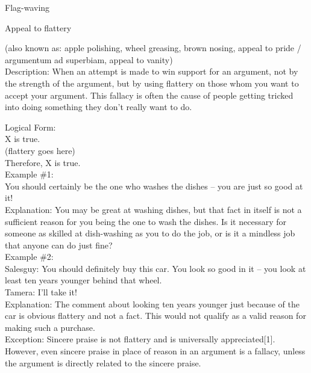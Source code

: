 \documentclass[a4paper,12pt,single,pdftex]{scrbook}
\begin{document}
  

Flag-waving

Appeal to flattery
    
      (also known as: apple polishing, wheel greasing, brown nosing, appeal to pride / argumentum ad superbiam, appeal to vanity)
    \\

  
    Description: When an attempt is made to win support for an argument, not by the strength of the argument, but by using flattery on those whom you want to accept your argument.  This fallacy is often the cause of people getting tricked into doing something they don’t really want to do.

    
      Logical Form:
    \\

    
      X is true.
    \\

    
      (flattery goes here)
    \\

    
      Therefore, X is true.
    \\

    
      Example \#1:
    \\

    
      You should certainly be the one who washes the dishes -- you are just so good at it!
    \\

    
      Explanation: You may be great at washing dishes, but that fact in itself is not a sufficient reason for you being the one to wash the dishes.  Is it necessary for someone as skilled at dish-washing as you to do the job, or is it a mindless job that anyone can do just fine?
    \\

    
      Example \#2:
    \\

    
      Salesguy: You should definitely buy this car.  You look so good in it -- you look at least ten years younger behind that wheel.
    \\

    
      Tamera: I’ll take it!
    \\

    
      Explanation: The comment about looking ten years younger just because of the car is obvious flattery and not a fact.  This would not qualify as a valid reason for making such a purchase.
    \\

    
      Exception: Sincere praise is not flattery and is universally appreciated[1].  However, even sincere praise in place of reason in an argument is a fallacy, unless the argument is directly related to the sincere praise.
    \\
\end{document}
